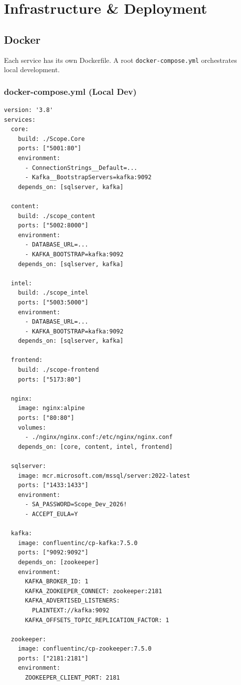 \documentclass[12pt,letterpaper]{article}
\begin{document}
\newpage

\section{Infrastructure \& Deployment}

\subsection{Docker}
Each service has its own Dockerfile. A root \texttt{docker-compose.yml} orchestrates local development.

\subsubsection{docker-compose.yml (Local Dev)}
\begin{lstlisting}[style=code]
version: '3.8'
services:
  core:
    build: ./Scope.Core
    ports: ["5001:80"]
    environment:
      - ConnectionStrings__Default=...
      - Kafka__BootstrapServers=kafka:9092
    depends_on: [sqlserver, kafka]

  content:
    build: ./scope_content
    ports: ["5002:8000"]
    environment:
      - DATABASE_URL=...
      - KAFKA_BOOTSTRAP=kafka:9092
    depends_on: [sqlserver, kafka]

  intel:
    build: ./scope_intel
    ports: ["5003:5000"]
    environment:
      - DATABASE_URL=...
      - KAFKA_BOOTSTRAP=kafka:9092
    depends_on: [sqlserver, kafka]

  frontend:
    build: ./scope-frontend
    ports: ["5173:80"]

  nginx:
    image: nginx:alpine
    ports: ["80:80"]
    volumes:
      - ./nginx/nginx.conf:/etc/nginx/nginx.conf
    depends_on: [core, content, intel, frontend]

  sqlserver:
    image: mcr.microsoft.com/mssql/server:2022-latest
    ports: ["1433:1433"]
    environment:
      - SA_PASSWORD=Scope_Dev_2026!
      - ACCEPT_EULA=Y

  kafka:
    image: confluentinc/cp-kafka:7.5.0
    ports: ["9092:9092"]
    depends_on: [zookeeper]
    environment:
      KAFKA_BROKER_ID: 1
      KAFKA_ZOOKEEPER_CONNECT: zookeeper:2181
      KAFKA_ADVERTISED_LISTENERS:
        PLAINTEXT://kafka:9092
      KAFKA_OFFSETS_TOPIC_REPLICATION_FACTOR: 1

  zookeeper:
    image: confluentinc/cp-zookeeper:7.5.0
    ports: ["2181:2181"]
    environment:
      ZOOKEEPER_CLIENT_PORT: 2181
\end{lstlisting}
\end{document}

